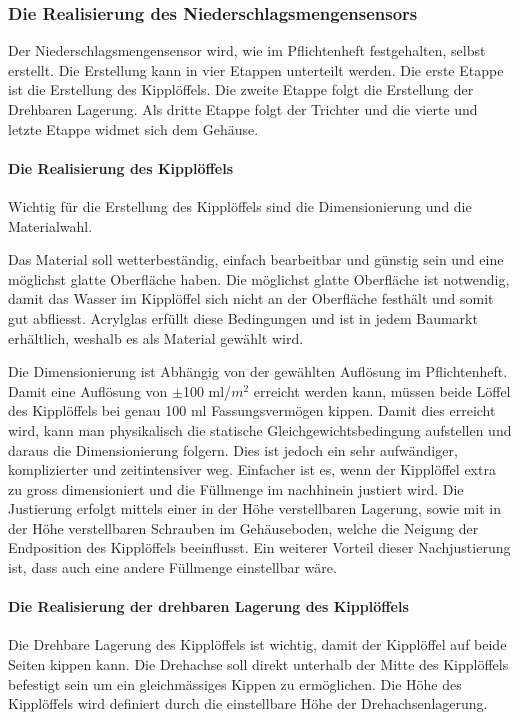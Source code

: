 \subsubsection*{Die Realisierung des Niederschlagsmengensensors}
Der Niederschlagsmengensensor wird, wie im Pflichtenheft festgehalten, selbst erstellt. Die Erstellung kann in vier Etappen unterteilt werden. Die erste Etappe ist die Erstellung des Kipplöffels. Die zweite Etappe folgt die Erstellung der Drehbaren Lagerung. Als dritte Etappe folgt der Trichter und die vierte und letzte Etappe widmet sich dem Gehäuse.
\paragraph{Die Realisierung des Kipplöffels}
Wichtig für die Erstellung des Kipplöffels sind die Dimensionierung und die Materialwahl.
 
Das Material soll wetterbeständig, einfach bearbeitbar und günstig sein und eine möglichst glatte Oberfläche haben. Die möglichst glatte Oberfläche ist notwendig, damit das Wasser im Kipplöffel sich nicht an der Oberfläche festhält und somit gut abfliesst. Acrylglas erfüllt diese Bedingungen und ist in jedem Baumarkt erhältlich, weshalb es als Material gewählt wird.

Die Dimensionierung ist Abhängig von der gewählten Auflösung im Pflichtenheft. Damit eine Auflösung von $\pm$100 ml/$m^2$ erreicht werden kann, müssen beide Löffel des Kipplöffels bei genau 100 ml Fassungsvermögen kippen. Damit dies erreicht wird, kann man physikalisch die statische Gleichgewichtsbedingung aufstellen und daraus die Dimensionierung folgern. Dies ist jedoch ein sehr aufwändiger, komplizierter und zeitintensiver weg. Einfacher ist es, wenn der Kipplöffel extra zu gross dimensioniert und die Füllmenge im nachhinein justiert wird. Die Justierung erfolgt mittels einer in der Höhe verstellbaren Lagerung, sowie mit in der Höhe verstellbaren Schrauben im Gehäuseboden, welche die Neigung der Endposition des Kipplöffels beeinflusst. Ein weiterer Vorteil dieser Nachjustierung ist, dass auch eine andere Füllmenge einstellbar wäre.

\paragraph{Die Realisierung der drehbaren Lagerung des Kipplöffels}
Die Drehbare Lagerung des Kipplöffels ist wichtig, damit der Kipplöffel auf beide Seiten kippen kann. Die Drehachse soll direkt unterhalb der Mitte des Kipplöffels befestigt sein um ein gleichmässiges Kippen zu ermöglichen. Die Höhe des Kipplöffels wird definiert durch die einstellbare Höhe der Drehachsenlagerung. 

